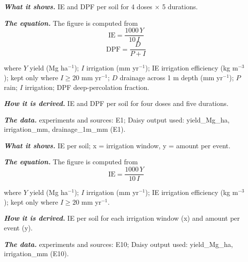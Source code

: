 \par\vspace{6pt}\noindent{}\par\nobreak
{}\label{fig:a20_9}
\par\noindent\textbf{\color{khmag}\emph{What it shows.}} IE and DPF per soil for 4 doses $\times$ 5 durations.
\par\noindent\textbf{\color{khmag}\emph{The equation.}} The figure is computed from
\begin{equation}\boxed{\mathrm{IE}=\dfrac{1000\,Y}{10\,I}}\end{equation}
\begin{equation}\boxed{\mathrm{DPF}=\dfrac{D}{P+I}}\end{equation}
\par\noindent where $Y$ yield (Mg ha$^{-1}$); $I$ irrigation (mm yr$^{-1}$); IE irrigation efficiency (kg m$^{-3}$); kept only where $I\ge 20$ mm yr$^{-1}$; $D$ drainage across 1 m depth (mm yr$^{-1}$); $P$ rain; $I$ irrigation; DPF deep-percolation fraction.
\par\noindent\textbf{\color{khmag}\emph{How it is derived.}} IE and DPF per soil for four doses and five durations.
\par\noindent\textbf{\color{khmag}\emph{The data.}} experiments and sources: E1; Daisy output used: yield\_Mg\_ha, irrigation\_mm, drainage\_1m\_mm (E1).
\par\vspace{6pt}\noindent{}\par\nobreak
{}\label{fig:a20_10}
\par\noindent\textbf{\color{khmag}\emph{What it shows.}} IE per soil; x = irrigation window, y = amount per event.
\par\noindent\textbf{\color{khmag}\emph{The equation.}} The figure is computed from
\begin{equation}\boxed{\mathrm{IE}=\dfrac{1000\,Y}{10\,I}}\end{equation}
\par\noindent where $Y$ yield (Mg ha$^{-1}$); $I$ irrigation (mm yr$^{-1}$); IE irrigation efficiency (kg m$^{-3}$); kept only where $I\ge 20$ mm yr$^{-1}$.
\par\noindent\textbf{\color{khmag}\emph{How it is derived.}} IE per soil for each irrigation window (x) and amount per event (y).
\par\noindent\textbf{\color{khmag}\emph{The data.}} experiments and sources: E10; Daisy output used: yield\_Mg\_ha, irrigation\_mm (E10).
